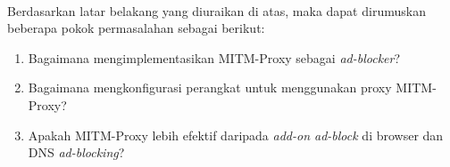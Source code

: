 \documentclass[../PROPOSAL_PRA_SKRIPSI_ALDZIKRI_DWIJAYANTO_PRATHAMA.tex]{subfiles}
\begin{document}
  \paragraph*{}Berdasarkan latar belakang yang diuraikan di
  atas, maka dapat dirumuskan beberapa pokok permasalahan
  sebagai berikut:
  \begin{enumerate}
    \item Bagaimana mengimplementasikan MITM-Proxy sebagai
      \textit{ad-blocker}?
    \item Bagaimana mengkonfigurasi perangkat untuk
      menggunakan proxy MITM-Proxy?
    \item Apakah MITM-Proxy lebih efektif daripada
      \textit{add-on ad-block} di browser dan DNS
      \textit{ad-blocking}?
  \end{enumerate}
\end{document}
